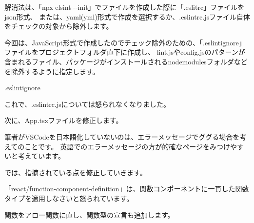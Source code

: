 \vspace*{\baselineskip}

解消法は、「npx elsint {-}{-}init」でファイルを作成した際に「.eslitrc」ファイルをjson形式、
または、yaml(yml)形式で作成を選択するか、.eslintrc.jsファイル自体をチェックの対象から除外します。

\vspace*{\baselineskip}

今回は、JavaScript形式で作成したのでチェック除外のための、「.eslintignore」ファイルをプロジェクトフォルダ直下に作成し、
lint.jsやconfig.jsのパターンが含まれるファイル、パッケージがインストールされるnode\textunderscore{}modulesフォルダなどを除外するように指定します。

\def\startercodeblockfontsize{}
\begin{starterprogram}[]{.eslintignore}\end{starterprogram}

これで、.eslintrc.jsについては怒られなくなりました。

次に、App.tsxファイルを修正します。

\begin{starternote}[]{}

筆者がVSCodeを日本語化していないのは、エラーメッセージでググる場合を考えてのことです。
英語でのエラーメッセージの方が的確なページをみつけやすいと考えています。

\end{starternote}

では、指摘されている点を修正していきます。

「react/function{-}component{-}definition」は、関数コンポーネントに一貫した関数タイプを適用しなさいと怒られています。

関数をアロー関数に直し、関数型の宣言も追加します。

